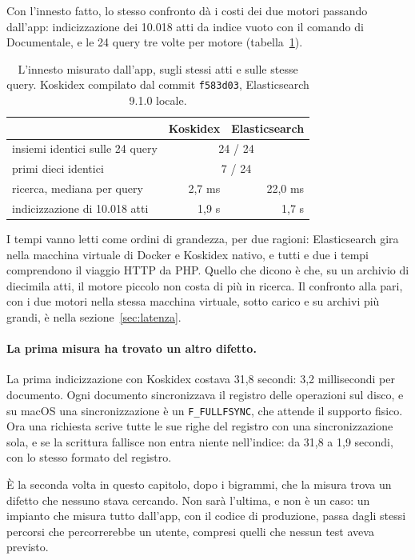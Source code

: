 Con l'innesto fatto, lo stesso confronto dà i costi dei due motori passando
dall'app: indicizzazione dei 10.018 atti da indice vuoto con il comando di
Documentale, e le 24 query tre volte per motore (tabella~\ref{tab:innesto}).

\begin{table}[ht]
  \centering
  \begin{tabular}{lrr}
    \toprule
    & Koskidex & Elasticsearch \\
    \midrule
    insiemi identici sulle 24 query & \multicolumn{2}{c}{24 / 24} \\
    primi dieci identici & \multicolumn{2}{c}{7 / 24} \\
    ricerca, mediana per query & 2,7 ms & 22,0 ms \\
    indicizzazione di 10.018 atti & 1,9 s & 1,7 s \\
    \bottomrule
  \end{tabular}
  \caption{L'innesto misurato dall'app, sugli stessi atti e sulle stesse query.
  Koskidex compilato dal commit \texttt{f583d03}, Elasticsearch 9.1.0 locale.}
  \label{tab:innesto}
\end{table}

I tempi vanno letti come ordini di grandezza, per due ragioni: Elasticsearch
gira nella macchina virtuale di Docker e Koskidex nativo, e tutti e due i tempi
comprendono il viaggio HTTP da PHP. Quello che dicono è che, su un archivio di
diecimila atti, il motore piccolo non costa di più in ricerca. Il confronto alla pari,
con i due motori nella stessa macchina virtuale, sotto carico e su archivi più
grandi, è nella sezione~\ref{sec:latenza}.

\paragraph{La prima misura ha trovato un altro difetto.} La prima
indicizzazione con Koskidex costava 31,8 secondi: 3,2 millisecondi per
documento. Ogni documento sincronizzava il registro delle operazioni
sul disco, e su macOS una sincronizzazione è un \texttt{F\_FULLFSYNC}, che
attende il supporto fisico. Ora una richiesta scrive tutte le sue righe del
registro con una sincronizzazione sola, e se la scrittura fallisce non entra
niente nell'indice: da 31,8 a 1,9 secondi, con lo stesso formato del registro.

È la seconda volta in questo capitolo, dopo i bigrammi, che la misura trova un
difetto che nessuno stava cercando. Non sarà l'ultima, e non è un caso: un
impianto che misura tutto dall'app, con il codice di produzione, passa dagli
stessi percorsi che percorrerebbe un utente, compresi quelli che nessun test
aveva previsto.
